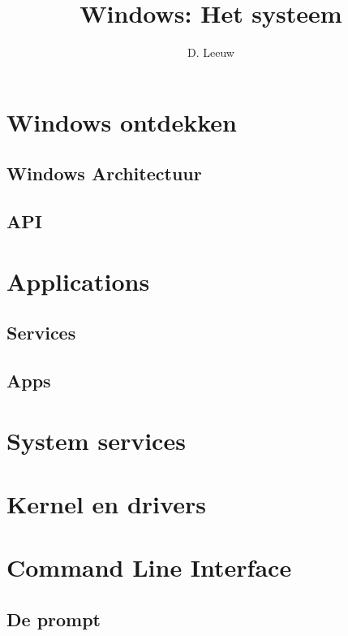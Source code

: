 \documentclass[a4paper,12pt,twoside,titlepage]{article}
\author{D. Leeuw}
\title{Windows: Het systeem}
\date{\today\\
0.0.0
\vfill
\raggedright
\copyright\ 2025-2026 Dennis Leeuw\\
}
\begin{document}

\maketitle



\section{Windows ontdekken}


\subsection{Windows Architectuur}

\subsection{API}


\section{Applications}
\subsection{Services}

\subsection{Apps}


\section{System services}


\section{Kernel en drivers}


\section{Command Line Interface}

\subsection{De prompt}

\end{document}
